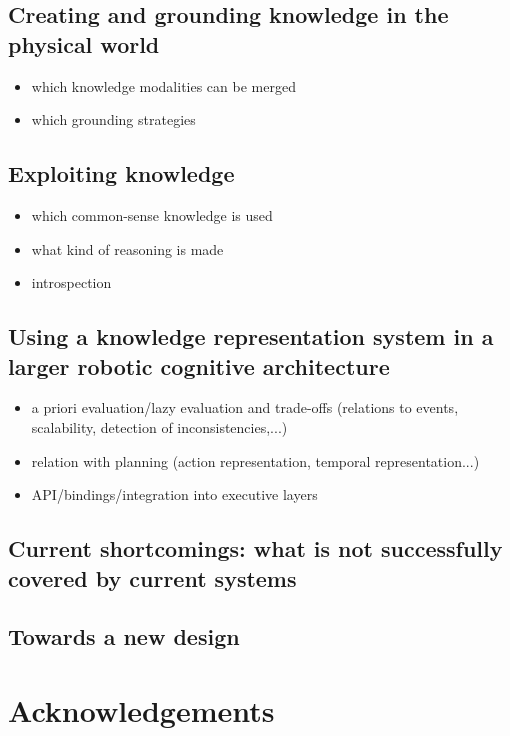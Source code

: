 \documentclass[a4paper, twocolumn]{article}
\begin{document}
\subsection{Creating and grounding knowledge in the physical world}
\label{sect|summary-grounding}


\begin{itemize}
	\item which knowledge modalities can be merged
	\item which grounding strategies
\end{itemize}


\subsection{Exploiting knowledge}
\label{sect|summary-knowledge-sources-reasoning}

\begin{itemize}
	\item which common-sense knowledge is used
	\item what kind of reasoning is made
	\item introspection
\end{itemize}


\subsection{Using a knowledge representation system in a larger robotic cognitive architecture}
\label{sect|summary-integration}

\begin{itemize}
	\item a priori evaluation/lazy evaluation and trade-offs (relations to events, scalability, detection of inconsistencies,...)
	\item relation with planning (action representation, temporal representation...)
	\item API/bindings/integration into executive layers
\end{itemize}

\subsection{Current shortcomings: what is not successfully covered by current systems}

\subsection{Towards a new design}

\section*{Acknowledgements} 




\end{document}
